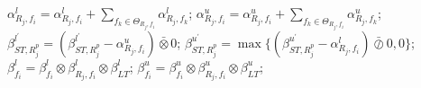 \documentclass[preprint]{elsarticle}
\begin{document}
\begin{algorithm}[!h]
\begin{algorithmic}[1]
                    \State $\alpha^l_{R_j,f_i}=\alpha^l_{R_j,f_i}+\sum_{f_k\in\Theta_{R_j,f_i}}\alpha^l_{R_j,f_k}$;
                    \State $\alpha^u_{R_j,f_i}=\alpha^u_{R_j,f_i}+\sum_{f_k\in\Theta_{R_j,f_i}}\alpha^u_{R_j,f_k}$;
                    \State $\beta^{l^\prime}_{ST,R_j^{p}}=(\beta^{l^\prime}_{ST,R_j^{p}}-\alpha^u_{R_j,f_i})\bar{\otimes}0$;
                    \State $\beta^{u^\prime}_{ST,R_j^{p}}=\max\{(\beta^{u^\prime}_{ST,R_j^{p}}-\alpha^l_{R_j,f_i})\bar{\oslash}0,0\}$;
                \EndIf
            \EndIf
            \State $\beta_{f_i}^l=\beta_{f_i}^l\otimes\beta^l_{R_j,f_i}\otimes\beta^l_{LT}$; $\beta_{f_i}^u=\beta_{f_i}^u\otimes\beta^u_{R_j,f_i}\otimes\beta^u_{LT}$;
        \EndFor
    \EndFor
\end{algorithmic}
\end{algorithm}
\end{document}
